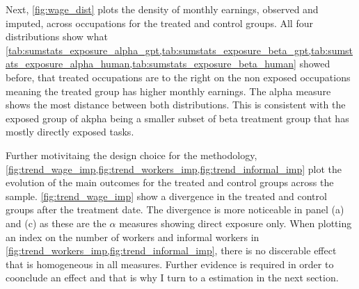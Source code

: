 Next, \cref{fig:wage_dist} plots the density of monthly earnings, observed and imputed, across occupations for the treated and control groups. All four distributions show what  \cref{tab:sumstats_exposure_alpha_gpt,tab:sumstats_exposure_beta_gpt,tab:sumstats_exposure_alpha_human,tab:sumstats_exposure_beta_human} showed before, that treated occupations are to the right on the non exposed occupations meaning the treated group has higher monthly earnings. The alpha measure shows the most distance between both distributions. This is consistent with the exposed group of akpha being a smaller subset of beta treatment group that has mostly directly exposed tasks.

Further motivitaing the design choice for the methodology, \cref{fig:trend_wage_imp,fig:trend_workers_imp,fig:trend_informal_imp} plot the evolution of the main outcomes for the treated and control groups across the sample. \cref{fig:trend_wage_imp} show a divergence in the treated and control groups after the treatment date. The divergence is more noticeable in panel (a) and (c) as these are the $\alpha$ measures showing direct exposure only. When plotting an index on the number of workers and informal workers in \cref{fig:trend_workers_imp,fig:trend_informal_imp}, there is no discerable effect that is homogeneous in all measures. Further evidence is required in order to coonclude an effect and that is why I turn to a  estimation in the next section.





